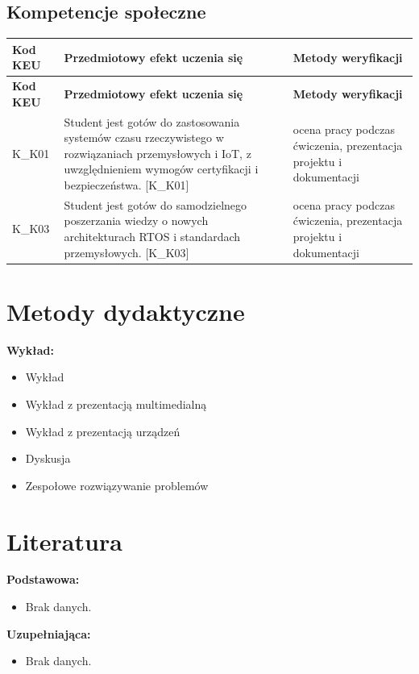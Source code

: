 \documentclass[12pt, a4paper]{article}
\newcommand{\thdrule}{\noalign{\global\setlength{\extrarowheight}{0pt}}}
\newcommand{\thdend}{\noalign{\global\setlength{\extrarowheight}{3pt}}}
\begin{document}
\subsection*{Kompetencje społeczne}
{\scriptsize
\begin{longtable}{m{1.6cm}m{9.0cm}m{4.2cm}}
\thdrule\toprule
\rowcolor{pjatkRed} {\color{white}\footnotesize\textbf{\vphantom{Ag}Kod KEU}} & {\color{white}\footnotesize\textbf{\vphantom{Ag}Przedmiotowy efekt uczenia się}} & {\color{white}\footnotesize\textbf{\vphantom{Ag}Metody weryfikacji}} \\
\midrule\thdend
\endfirsthead
\thdrule\toprule
\rowcolor{pjatkRed} {\color{white}\footnotesize\textbf{\vphantom{Ag}Kod KEU}} & {\color{white}\footnotesize\textbf{\vphantom{Ag}Przedmiotowy efekt uczenia się}} & {\color{white}\footnotesize\textbf{\vphantom{Ag}Metody weryfikacji}} \\
\midrule\thdend
\endhead
  \rowcolor{tableRowLight} K\_K01 & Student jest gotów do zastosowania systemów czasu rzeczywistego w rozwiązaniach przemysłowych i IoT, z uwzględnieniem wymogów certyfikacji i bezpieczeństwa. {[}K\_K01{]} & ocena pracy podczas ćwiczenia, prezentacja projektu i dokumentacji \\
  \rowcolor{tableRowAlt} K\_K03 & Student jest gotów do samodzielnego poszerzania wiedzy o nowych architekturach RTOS i standardach przemysłowych. {[}K\_K03{]} & ocena pracy podczas ćwiczenia, prezentacja projektu i dokumentacji \\
\bottomrule
\end{longtable}}

\section{Metody dydaktyczne}

\textbf{Wykład:}
\begin{itemize}
  \item Wykład
  \item Wykład z prezentacją multimedialną
  \item Wykład z prezentacją urządzeń
  \item Dyskusja
  \item Zespołowe rozwiązywanie problemów
\end{itemize}
\vspace{4pt}


\section{Literatura}

\textbf{Podstawowa:}
\begin{itemize}
  \item Brak danych.
\end{itemize}

\textbf{Uzupełniająca:}
\begin{itemize}
  \item Brak danych.
\end{itemize}
\end{document}
